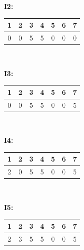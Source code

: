 \documentclass[12pt]{exam}
\begin{document}
\begin{questions}
    {{\bf I2:}
        \par{
            \begin{tabular}{|c|c|c|c|c|c|c|}
                \multicolumn{1}{c}{1} & \multicolumn{1}{c}{2} &
                \multicolumn{1}{c}{3} & \multicolumn{1}{c}{4} &
                \multicolumn{1}{c}{5} & \multicolumn{1}{c}{6} &
                \multicolumn{1}{c}{7}
                \\ \hline
                0                     & 0                     & 5 & 5 & 0 & 0 & 0 \\
                \hline
            \end{tabular}}}\\

    {{\bf I3:}
    \par{
        \begin{tabular}{|c|c|c|c|c|c|c|}
            \multicolumn{1}{c}{1} & \multicolumn{1}{c}{2} &
            \multicolumn{1}{c}{3} & \multicolumn{1}{c}{4} &
            \multicolumn{1}{c}{5} & \multicolumn{1}{c}{6} &
            \multicolumn{1}{c}{7}
            \\ \hline
            0                     & 0                     & 5 & 5 & 0 & 0 & 5 \\
            \hline
        \end{tabular}}}\\

    {{\bf I4:}
    \par{
        \begin{tabular}{|c|c|c|c|c|c|c|}
            \multicolumn{1}{c}{1} & \multicolumn{1}{c}{2} &
            \multicolumn{1}{c}{3} & \multicolumn{1}{c}{4} &
            \multicolumn{1}{c}{5} & \multicolumn{1}{c}{6} &
            \multicolumn{1}{c}{7}
            \\ \hline
            2                     & 0                     & 5 & 5 & 0 & 0 & 5 \\
            \hline
        \end{tabular}}}\\

    {{\bf I5:}
    \par{
        \begin{tabular}{|c|c|c|c|c|c|c|}
            \multicolumn{1}{c}{1} & \multicolumn{1}{c}{2} &
            \multicolumn{1}{c}{3} & \multicolumn{1}{c}{4} &
            \multicolumn{1}{c}{5} & \multicolumn{1}{c}{6} &
            \multicolumn{1}{c}{7}
            \\ \hline
            2                     & 3                     & 5 & 5 & 0 & 0 & 5 \\
            \hline
        \end{tabular}}}\\


\end{questions}
\end{document}
